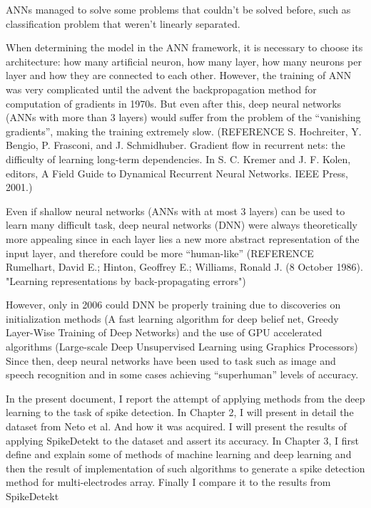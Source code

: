 \documentclass{article}
\begin{document}
ANNs managed to solve some problems that couldn't be solved before, such as classification problem that weren't linearly separated.

When determining the model in the ANN framework, it is necessary to choose its architecture: how many artificial neuron, how many layer, how many neurons per layer and how they are connected to each other.  However, the training of ANN was very complicated until the advent the backpropagation method for computation of gradients in 1970s.  But even after this, deep neural networks (ANNs with more than 3 layers) would suffer from the problem of the “vanishing gradients”, making the training extremely slow. (REFERENCE S. Hochreiter, Y. Bengio, P. Frasconi, and J. Schmidhuber. Gradient flow in recurrent nets: the difficulty of learning long-term dependencies. In S. C. Kremer and J. F. Kolen, editors, A Field Guide to Dynamical Recurrent Neural Networks. IEEE Press, 2001.)

Even if shallow neural networks (ANNs with at most 3 layers) can be used to learn many difficult task, deep neural networks (DNN) were always theoretically more appealing since in each layer lies a new more abstract representation of the input layer, and therefore could be more “human-like” (REFERENCE Rumelhart, David E.; Hinton, Geoffrey E.; Williams, Ronald J. (8 October 1986). "Learning representations by back-propagating errors")

However, only in 2006 could DNN be properly training due to discoveries on initialization methods (A fast learning algorithm for deep belief net, Greedy Layer-Wise Training of Deep Networks) and the use of GPU accelerated algorithms (Large-scale Deep Unsupervised Learning using Graphics Processors)
Since then, deep neural networks have been used to task such as image and speech recognition and in some cases achieving “superhuman” levels of accuracy.

In the present document, I report the attempt of applying methods from the deep learning to the task of spike detection. In Chapter 2, I will present in detail the dataset from Neto et al. And how it was acquired. I will present the results of applying SpikeDetekt to the dataset and assert its accuracy. In Chapter 3, I first define and explain some of methods of machine learning and deep learning and then the result of implementation of such algorithms to generate a spike detection method for multi-electrodes array. Finally I compare it to the results from SpikeDetekt
\end{document}

